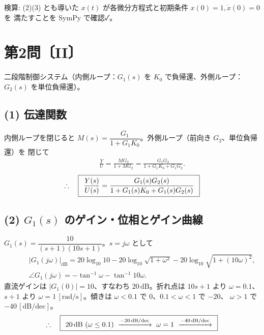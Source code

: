 \documentclass[11pt,a4paper]{article}
\begin{document}
\bigskip
\noindent 検算: (2)(3) とも導いた $x(t)$ が各微分方程式と初期条件 $x(0)=1,\dot x(0)=0$ を
満たすことを SymPy で確認✓。

\newpage
\section*{第2問〔II〕}

二段階制御システム（内側ループ：$G_1(s)$ を $K_0$ で負帰還、外側ループ：$G_2(s)$ を単位負帰還）。

\subsection*{(1) 伝達関数}
内側ループを閉じると $M(s)=\dfrac{G_1}{1+G_1K_0}$。外側ループ（前向き $G_2$、単位負帰還）を
閉じて
\begin{align*}
  &\qquad \frac{Y}{U}=\frac{M G_2}{1+M G_2}=\frac{G_1G_2}{1+G_1K_0+G_1G_2}.
\end{align*}
\[
  \therefore\quad \boxed{\,\;\dfrac{Y(s)}{U(s)}=\dfrac{G_1(s)G_2(s)}{1+G_1(s)K_0+G_1(s)G_2(s)}\;\,}
\]

\subsection*{(2) $G_1(s)$ のゲイン・位相とゲイン曲線}
$G_1(s)=\dfrac{10}{(s+1)(10s+1)}$。$s=j\omega$ として
\begin{align*}
  &\qquad |G_1(j\omega)|_{\mathrm{dB}}=20\log_{10}10-20\log_{10}\sqrt{1+\omega^2}-20\log_{10}\sqrt{1+(10\omega)^2},\\
  &\qquad \angle G_1(j\omega)=-\tan^{-1}\omega-\tan^{-1}10\omega.
\end{align*}
直流ゲインは $|G_1(0)|=10$、すなわち $20\,\mathrm{dB}$。折れ点は $10s+1$ より $\omega=0.1$、
$s+1$ より $\omega=1\,[\mathrm{rad/s}]$。傾きは $\omega<0.1$ で $0$、$0.1<\omega<1$ で $-20$、
$\omega>1$ で $-40\,[\mathrm{dB/dec}]$。
\[
  \therefore\quad \ans{\;20\,\mathrm{dB}\ (\omega\le0.1)\ \xrightarrow{-20\,\mathrm{dB/dec}}\ \omega=1\ \xrightarrow{-40\,\mathrm{dB/dec}}\;}
\]
\end{document}
